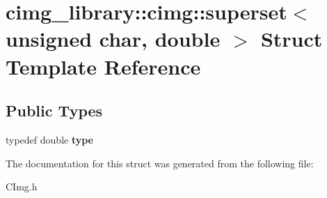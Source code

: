 \hypertarget{structcimg__library_1_1cimg_1_1superset_3_01unsigned_01char_00_01double_01_4}{\section{cimg\-\_\-library\-:\-:cimg\-:\-:superset$<$ unsigned char, double $>$ Struct Template Reference}
\label{structcimg__library_1_1cimg_1_1superset_3_01unsigned_01char_00_01double_01_4}
}
\subsection*{Public Types}
\begin{DoxyCompactItemize}
\item 
\hypertarget{structcimg__library_1_1cimg_1_1superset_3_01unsigned_01char_00_01double_01_4_afcfeb57cd8cf00a965dd9bd1228bccee}{typedef double {\bfseries type}}\label{structcimg__library_1_1cimg_1_1superset_3_01unsigned_01char_00_01double_01_4_afcfeb57cd8cf00a965dd9bd1228bccee}

\end{DoxyCompactItemize}


The documentation for this struct was generated from the following file\-:\begin{DoxyCompactItemize}
\item 
C\-Img.\-h\end{DoxyCompactItemize}
